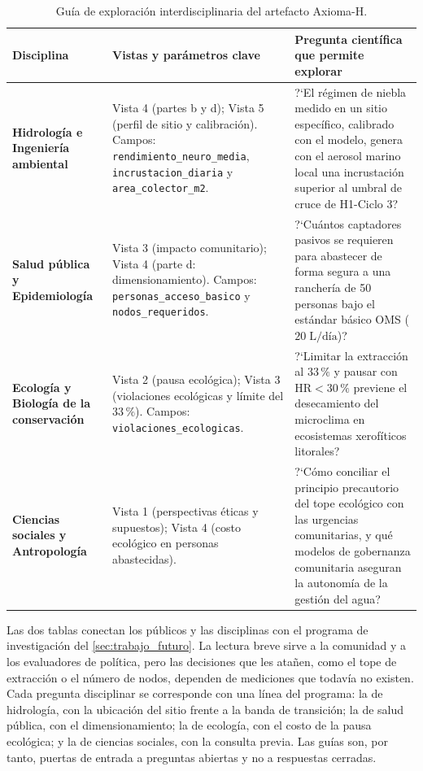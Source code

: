 \begin{table}[htbp]
\centering
\small
\caption{Gu\'ia de exploraci\'on interdisciplinaria del artefacto Axioma-H.}
\label{tab:disciplinas}
\begin{tabularx}{\textwidth}{@{}L{3.2cm}L{4.2cm}Y@{}}
\toprule
\textbf{Disciplina} & \textbf{Vistas y par\'ametros clave} & \textbf{Pregunta cient\'ifica que permite explorar} \\
\midrule
\textbf{Hidrolog\'ia e Ingenier\'ia ambiental} & Vista 4 (partes b y d); Vista 5 (perfil de sitio y calibraci\'on). Campos: \texttt{rendimiento\_\allowbreak neuro\_media}, \texttt{incrustacion\_\allowbreak diaria} y \texttt{area\_colector\_m2}. & ?`El r\'egimen de niebla medido en un sitio espec\'ifico, calibrado con el modelo, genera con el aerosol marino local una incrustaci\'on superior al umbral de cruce de H1-Ciclo 3? \\
\textbf{Salud p\'ublica y Epidemiolog\'ia} & Vista 3 (impacto comunitario); Vista 4 (parte d: dimensionamiento). Campos: \texttt{personas\_acceso\_basico} y \texttt{nodos\_requeridos}. & ?`Cu\'antos captadores pasivos se requieren para abastecer de forma segura a una rancher\'ia de 50 personas bajo el est\'andar b\'asico OMS ($20\;\text{L/d\'ia}$)? \\
\textbf{Ecolog\'ia y Biolog\'ia de la conservaci\'on} & Vista 2 (pausa ecol\'ogica); Vista 3 (violaciones ecol\'ogicas y l\'imite del $33\,\%$). Campos: \texttt{violaciones\_ecologicas}. & ?`Limitar la extracci\'on al $33\,\%$ y pausar con $\text{HR} < 30\,\%$ previene el desecamiento del microclima en ecosistemas xerof\'iticos litorales? \\
\textbf{Ciencias sociales y Antropolog\'ia} & Vista 1 (perspectivas \'eticas y supuestos); Vista 4 (costo ecol\'ogico en personas abastecidas). & ?`C\'omo conciliar el principio precautorio del tope ecol\'ogico con las urgencias comunitarias, y qu\'e modelos de gobernanza comunitaria aseguran la autonom\'ia de la gesti\'on del agua? \\
\bottomrule
\end{tabularx}
\end{table}

Las dos tablas conectan los p\'ublicos y las disciplinas con el programa de investigaci\'on del \cref{sec:trabajo_futuro}. La lectura breve sirve a la comunidad y a los evaluadores de pol\'itica, pero las decisiones que les ata\~nen, como el tope de extracci\'on o el n\'umero de nodos, dependen de mediciones que todav\'ia no existen. Cada pregunta disciplinar se corresponde con una l\'inea del programa: la de hidrolog\'ia, con la ubicaci\'on del sitio frente a la banda de transici\'on; la de salud p\'ublica, con el dimensionamiento; la de ecolog\'ia, con el costo de la pausa ecol\'ogica; y la de ciencias sociales, con la consulta previa. Las gu\'ias son, por tanto, puertas de entrada a preguntas abiertas y no a respuestas cerradas.

